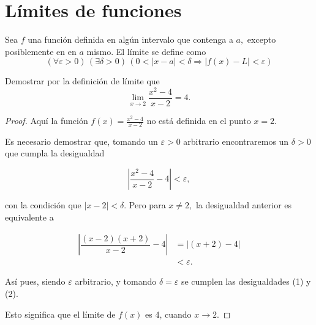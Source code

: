 \section*{L\'imites de funciones}

\begin{definition}
	Sea \(f\) una funci\'on definida en alg\'un intervalo que contenga a \(a,\) excepto posiblemente en en \(a\) mismo. El l\'imite se define como \[(\forall\varepsilon>0)\,(\exists\delta>0)\,(0<\left|x-a\right|<\delta\Rightarrow\left|f(x)-L\right|<\varepsilon)\]
\end{definition}


\begin{exercise}
Demostrar por la definici\'on de l\'imite que
\[
	\lim\limits_{x\to 2}{\dfrac{x^2-4}{x-2}}=4.
\]
\end{exercise}

\begin{proof}
Aqu\'i la funci\'on \(f(x)=\frac{x^2-4}{x-2}\) no est\'a definida en el punto \(x=2\).

Es necesario demostrar que, tomando un \(\varepsilon > 0\) arbitrario encontraremos un \(\delta >0\) que cumpla la desigualdad

\begin{equation}
	\left|\dfrac{x^2-4}{x-2}-4\right|<\varepsilon,
\end{equation}

con la condici\'on que \(\left|x-2\right|<\delta.\) Pero para \(x\neq 2,\) la desigualdad anterior es equivalente a 

\begin{equation}
\begin{aligned}
	\left|\dfrac{(x-2)(x+2)}{x-2}-4\right|&=\left|(x+2)-4\right|\\ 
		&<\varepsilon.
\end{aligned}
\end{equation}

As\'i pues, siendo \(\varepsilon\) arbitrario, y tomando \(\delta=\varepsilon\) se cumplen las desigualdades (1) y (2).

Esto significa que el l\'imite de \(f(x)\) es 4, cuando \(x\to 2.\)

\end{proof}

